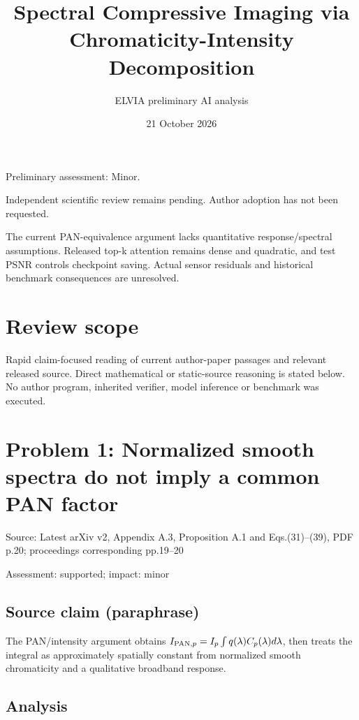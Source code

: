 \documentclass[11pt]{article}
\begin{document}
\title{Spectral Compressive Imaging via Chromaticity-Intensity Decomposition}

\author{ELVIA preliminary AI analysis}\date{21 October 2026}\maketitle

Preliminary assessment: Minor.\par

Independent scientific review remains pending. Author adoption has not been requested.

The current PAN-equivalence argument lacks quantitative response/spectral assumptions. Released top-k attention remains dense and quadratic, and test PSNR controls checkpoint saving. Actual sensor residuals and historical benchmark consequences are unresolved.

\section*{Review scope}

Rapid claim-focused reading of current author-paper passages and relevant released source. Direct mathematical or static-source reasoning is stated below. No author program, inherited verifier, model inference or benchmark was executed.

\section*{Problem 1: Normalized smooth spectra do not imply a common PAN factor}

Source: Latest arXiv v2, Appendix A.3, Proposition A.1 and Eqs.(31)–(39), PDF p.20; proceedings corresponding pp.19–20

Assessment: supported; impact: minor

\subsection*{Source claim (paraphrase)}

The PAN/intensity argument obtains \(I_{{\rm PAN},p}=I_p\int q(\lambda)C_p(\lambda)d\lambda\), then treats the integral as approximately spatially constant from normalized smooth chromaticity and a qualitative broadband response.

\subsection*{Analysis}
\end{document}
